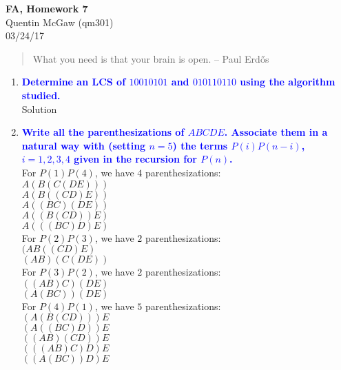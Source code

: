 \documentclass[11pt]{article}
\begin{document}
\begin{center} {\Large\bf FA, Homework 7}  \\ Quentin McGaw (qm301) \\ 03/24/17
\end{center}

\begin{quote}
What you need is that your brain is open.  -- Paul Erd\H{o}s
\end{quote}

\begin{enumerate}
\item \textbf{\textcolor{blue}{Determine an LCS of $10010101$ and $010110110$ using the algorithm studied.}}
    \\ Solution
    
    
\item \textbf{\textcolor{blue}{Write all the parenthesizations of $ABCDE$.
Associate them in a natural way with (setting $n=5$) the
terms $P(i)P(n-i)$, $i=1,2,3,4$ given in the recursion for $P(n)$.}}
    \\ For $P(1)P(4)$, we have $4$ parenthesizations:
    \\ $A(B(C(DE)))$
    \\ $A(B((CD)E))$
    \\ $A((BC)(DE))$
    \\ $A((B(CD))E)$
    \\ $A(((BC)D)E)$
    \\ For $P(2)P(3)$, we have $2$ parenthesizations:
    \\ $(AB((CD)E)$
    \\ $(AB)(C(DE))$
    \\ For $P(3)P(2)$, we have $2$ parenthesizations:
    \\ $((AB)C)(DE)$
    \\ $(A(BC))(DE)$
    \\ For $P(4)P(1)$, we have $5$ parenthesizations:
    \\ $(A(B(CD)))E$
    \\ $(A((BC)D))E$
    \\ $((AB)(CD))E$
    \\ $(((AB)C)D)E$
    \\ $((A(BC))D)E$



    
    

\end{enumerate}
\end{document}
